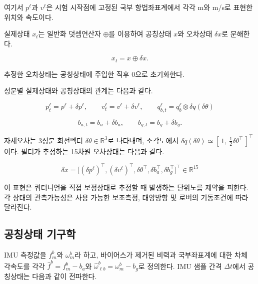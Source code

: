 \documentclass[]{IAC_style}
\begin{document}
여기서 $p^\ell$과 $v^\ell$은 시험 시작점에 고정된 국부 항법좌표계에서 각각 m와 m/s로 표현한 위치와 속도이다.

실제상태 $x_t$는 일반화 덧셈연산자 $\oplus$를 이용하여 공칭상태 $x$와 오차상태 $\delta x$로 분해한다.

\begin{equation}
\tag{16}\label{eq:16}
x_t=x\oplus\delta x.
\end{equation}

추정한 오차상태는 공칭상태에 주입한 직후 0으로 초기화한다.

성분별 실제상태와 공칭상태의 관계는 다음과 같다.

\begin{equation}
\tag{17}\label{eq:17}
p_t^\ell=p^\ell+\delta p^\ell,\qquad v_t^\ell=v^\ell+\delta v^\ell,\qquad q_{b,t}^\ell=q_b^\ell\otimes\delta q(\delta\theta)
\end{equation}

\begin{equation}
\tag{18}\label{eq:18}
b_{a,t} = b_a + \delta b_a, \qquad b_{g,t} = b_g + \delta b_g.
\end{equation}

자세오차는 3성분 회전벡터 $\delta\theta \in \mathbb{R}^3$로 나타내며, 소각도에서 $\delta q(\delta\theta) \simeq [\,1,\ \tfrac{1}{2}\delta\theta^{\top}\,]^{\top}$이다. 필터가 추정하는 15차원 오차상태는 다음과 같다.

\begin{equation}
\tag{19}\label{eq:19}
\delta x=\bigl[(\delta p^\ell)^{\top},(\delta v^\ell)^{\top},\delta\theta^{\top},\delta b_a^{\top},\delta b_g^{\top}\bigr]^{\top}\in\mathbb{R}^{15}
\end{equation}

이 표현은 쿼터니언을 직접 보정상태로 추정할 때 발생하는 단위노름 제약을 피한다. 각 상태의 관측가능성은 사용 가능한 보조측정, 태양방향 및 로버의 기동조건에 따라 달라진다.

\subsection{공칭상태 기구학}

IMU 측정값을 $f_m^b$와 $\omega_m^b$라 하고, 바이어스가 제거된 비력과 국부좌표계에 대한 차체 각속도를 각각 $\hat f^b=f_m^b-b_a$와 $\hat\omega_{\ell b}^b=\omega_m^b-b_g$로 정의한다. IMU 샘플 간격 $\Delta t$에서 공칭상태는 다음과 같이 전파한다.
\end{document}
